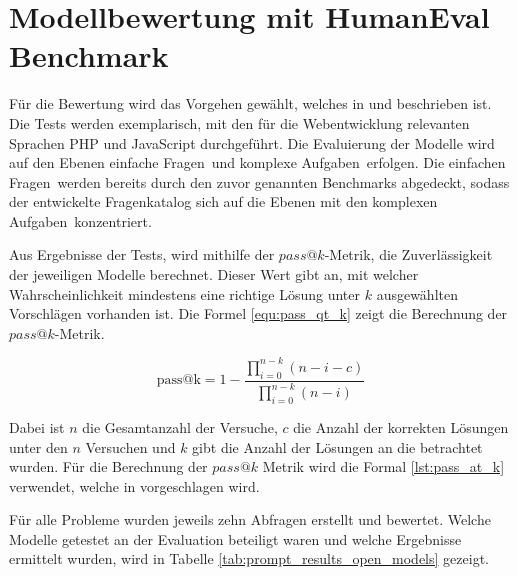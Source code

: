 \section{Modellbewertung mit HumanEval Benchmark}
Für die Bewertung wird das Vorgehen gewählt, welches in \cite{chen-2021} und \cite{peng-2024} beschrieben ist. Die Tests werden exemplarisch, mit den für die Webentwicklung relevanten Sprachen PHP und JavaScript durchgeführt. Die Evaluierung der Modelle wird auf den Ebenen \glqq einfache Fragen\grqq \ und \glqq komplexe Aufgaben\grqq \ erfolgen. Die \glqq einfachen Fragen\grqq \ werden bereits durch den zuvor genannten Benchmarks abgedeckt, sodass der entwickelte Fragenkatalog sich auf die Ebenen mit den \glqq komplexen Aufgaben\grqq \ konzentriert.\vspace{0.2cm}

Aus Ergebnisse der Tests, wird mithilfe der $pass@k$-Metrik, die Zuverlässigkeit der jeweiligen Modelle berechnet. Dieser Wert gibt an, mit welcher Wahrscheinlichkeit mindestens eine richtige Lösung unter $k$ ausgewählten Vorschlägen vorhanden ist. Die Formel \ref{equ:pass_qt_k} zeigt die Berechnung der $pass@k$-Metrik.

\begin{equation}\label{equ:pass_qt_k}
	\text{pass@k} = 1 - \frac{\prod_{i=0}^{n-k} (n - i - c)}{\prod_{i=0}^{n-k} (n - i)}
\end{equation}

Dabei ist $n$ die Gesamtanzahl der Versuche, $c$ die Anzahl der korrekten Lösungen unter den $n$ Versuchen und $k$ gibt die Anzahl der Lösungen an die betrachtet wurden. Für die Berechnung der $pass@k$ Metrik wird die Formal \ref{lst:pass_at_k} verwendet, welche in \cite{chen-2021} vorgeschlagen wird.\vspace{0.2cm}

Für alle Probleme wurden jeweils zehn Abfragen erstellt und bewertet. Welche Modelle getestet an der Evaluation beteiligt waren und welche Ergebnisse ermittelt wurden, wird in Tabelle \ref{tab:prompt_results_open_models} gezeigt.

